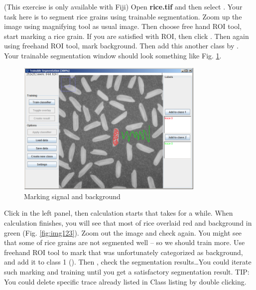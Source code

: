 \begin{indentexercise}{1}
(This exercise is only available with Fiji)
Open \textbf{rice.tif} and then select . Your task here is to segment rice grains using trainable segmentation. Zoom up the image
using magnifying tool as usual image. Then choose free hand ROI tool,
start marking a rice grain. If you are satisfied with ROI, then click
. Then
again using freehand ROI tool, mark background. Then add this another
class by . Your trainable segmentation window should look
something like Fig. \ref{fig:img122}. 

\begin{figure}[htbp]
\begin{center}
\includegraphics[width=9.001cm,height=6.447cm]{img/CMCIBasicCourse201102-img122.png}
\caption{ Marking signal and background}
\label{fig:img122}
\end{center}
\end{figure}

Click  in the left panel, then calculation starts that takes for a while. When
calculation finishes, you will see that most of rice overlaid red and background in green (Fig. \ref{fig:img123}). Zoom out the image and check again. You might see that some of rice grains are not segmented well -- so we should train more. Use freehand ROI tool to mark that was unfortunately categorized
as background, and add it to class 1 (). Then , check the segmentation results\ldots You
could iterate such marking and training until you get a satisfactory
segmentation result. TIP: You could delete specific trace already
listed in Class listing by double clicking.


\end{indentexercise}
